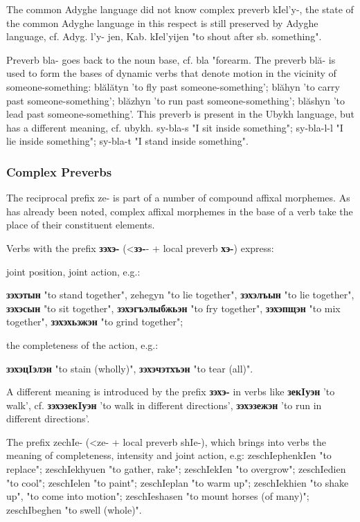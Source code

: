\documentclass[a4paper,12pt]{book}
\newcommand{\1}[1]{\textbf{\emph{#1}}} %
\newcommand{\2}[1]{\textbf{[#1]}} %
\newcommand{\3}[1]{\fontsize{11pt}{0cm}\textbf{\emph{#1}}} %
\newcommand{\4}[1]{\fontsize{10pt}{0cm}\emph{#1}}	%
\newcommand{\5}[1]{\textbf{/#1/}} %
\newcommand{\6}[1]{\textbf{[#1]}} %
\newcommand{\7}[1]{\fontsize{12pt}{0cm}\emph{#1}} %
\newcommand{\8}[1]{\fontsize{12pt}{0cm}`#1'} %
\newcommand{\9}[1]{\fontsize{12pt}{0cm}(lit. `#1')} %
\begin{document}
The common Adyghe language did not know complex preverb kIel'y-, the state of the common Adyghe language in this respect is still preserved by Adyghe language, cf. Adyg. l'y- jen, Kab. kIel'yijen "to shout after sb. something".

Preverb bla- goes back to the noun base, cf. bla "forearm. The preverb blă- is used to form the bases of dynamic verbs that denote motion in the vicinity of someone-something: blălătyn 'to fly past someone-something'; blăhyn 'to carry past someone-something'; blăzhyn 'to run past someone-something'; blăshyn 'to lead past someone-something'.
This preverb is present in the Ubykh language, but has a different meaning, cf. ubykh. sy-bla-s "I sit inside something"; sy-bla-l-l "I lie inside something"; sy-bla-t "I stand inside something".

\subsubsection{Complex Preverbs}
The reciprocal prefix ze- is part of a number of compound affixal morphemes. As has already been noted, complex affixal morphemes in the base of a verb take the place of their constituent elements.

Verbs with the prefix \textbf{зэхэ-} (<\textbf{зэ-}- + local preverb \textbf{хэ-}) express:
\begin{xlist}
	\ex joint position, joint action, e.g.: 
	\begin{xlist} 
		\ex \textbf{зэхэтын} "to stand together", zehegyn "to lie together", 
		\ex \textbf{зэхэлъын} "to lie together", 
		\ex \textbf{зэхэсын} "to sit together", 
		\ex \textbf{зэхэгъэлыбжьэн} "to fry together", 
		\ex \textbf{зэхэпщэн} "to mix together", 
		\ex \textbf{зэхэхьэжэн} "to grind together";
		
	\end{xlist}

	\ex the completeness of the action, e.g.: 
	\begin{xlist}
		\ex \textbf{зэхэцIэлэн} "to stain (wholly)", 
		\ex \textbf{зэхэчэтхъэн} "to tear (all)".
	\end{xlist}
\end{xlist}
A different meaning is introduced by the prefix \textbf{зэхэ-} in verbs like \textbf{зекIуэн} 'to walk', cf. \textbf{зэхэзекIуэн} 'to walk in different directions', \textbf{зэхэзежэн} 'to run in different directions'.

The prefix zechIe- (<ze- + local preverb shIe-), which brings into verbs the meaning of completeness, intensity and joint action, e.g: zeschIephenkIen "to replace"; zeschIekhyuen "to gather, rake"; zeschIekIen "to overgrow"; zeschIedien "to cool"; zeschIelen "to paint"; zeschIeplan "to warm up"; zeschIekhien "to shake up", "to come into motion"; zeschIeshasen "to mount horses (of many)"; zeschIbeghen "to swell (whole)".
\end{document}
